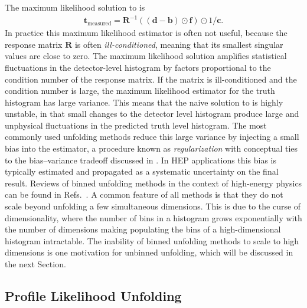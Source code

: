 The maximum likelihood solution to  is
\begin{align}
\label{eq:unfolding}
\textbf{t}_\text{measured} = \textbf{R}^{-1}\left( (\textbf{d}-\textbf{b})\odot \textbf{f}\right)\odot 1/\textbf{c}.
\end{align}
In practice this maximum likelihood estimator is often not useful, because the response matrix $\textbf{R}$ is often \textit{ill-conditioned}, meaning that its smallest singular values are close to zero.
The maximum likelihood solution amplifies statistical fluctuations in the detector-level histogram by factors proportional to the condition number of the response matrix.
If the matrix is ill-conditioned and the condition number is large, the maximum likelihood estimator for the truth histogram has large variance.
This means that the naive solution to  is highly unstable, in that small changes to the detector level histogram produce large and unphysical fluctuations in the predicted truth level histogram.
The most commonly used unfolding methods reduce this large variance by injecting a small bias into the estimator, a procedure known as \textit{regularization} with conceptual ties to the bias--variance tradeoff discussed in .
In HEP applications this bias is typically estimated and propagated as a systematic uncertainty on the final result.
Reviews of binned unfolding methods in the context of high-energy physics can be found in Refs.~\cite{Cowan:2002in, Blobel:2011fih}.
A common feature of all methods is that they do not scale beyond unfolding a few simultaneous dimensions.
This is due to the curse of dimensionality, where the number of bins in a histogram grows exponentially with the number of dimensions making populating the bins of a high-dimensional histogram intractable.
The inability of binned unfolding methods to scale to high dimensions is one motivation for unbinned unfolding, which will be discussed in the next Section.

\subsection{Profile Likelihood Unfolding}
\label{sec:plu}

